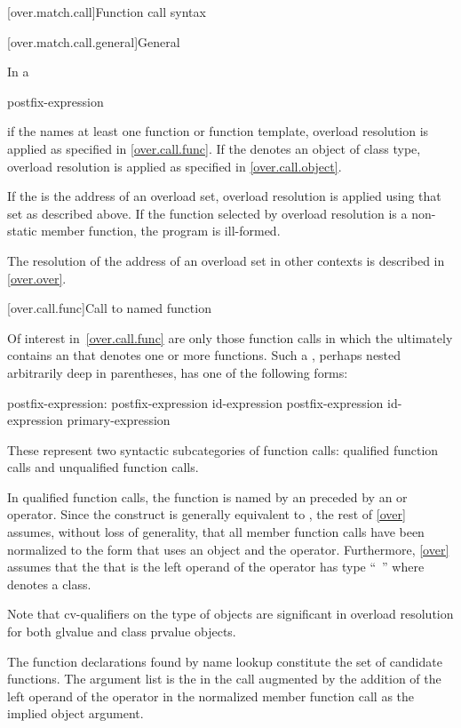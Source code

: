 [over.match.call]{Function call syntax}%

[over.match.call.general]{General}%

\pnum
In a 
\begin{ncsimplebnf}
postfix-expression \terminal{(}  \terminal{)}
\end{ncsimplebnf}
if the  names at least one function or
function template,
overload resolution is applied as specified in \ref{over.call.func}.
If the  denotes an object of class type, overload
resolution is applied as specified in \ref{over.call.object}.

\pnum
If the  is the address of an overload set,
overload resolution is applied using that set as described above.
If the function selected by overload resolution is a non-static member function,
the program is ill-formed.
\begin{note}
The resolution of the address of an
overload set in other contexts is described in \ref{over.over}.
\end{note}

[over.call.func]{Call to named function}

\pnum
Of interest in~\ref{over.call.func} are only those function calls in
which the 
ultimately contains an  that
denotes one or more functions.
Such a
,
perhaps nested arbitrarily deep in
parentheses, has one of the following forms:
\begin{ncbnf}
postfix-expression:\br
    postfix-expression  id-expression\br
    postfix-expression \terminal{->} id-expression\br
    primary-expression
\end{ncbnf}

These represent two syntactic subcategories of function calls:
qualified function calls and unqualified function calls.

\pnum
In qualified function calls,
the function is named by an 
preceded by an \tcode{->} or  operator.
Since the
construct
is generally equivalent to
,
the rest of
\ref{over} assumes, without loss of generality, that all member
function calls have been normalized to the form that uses an
object and the
operator.
Furthermore, \ref{over} assumes that
the
that is the left operand of the
operator
has type ``\cv{}~''
where
denotes a class.
\begin{footnote}
Note that cv-qualifiers on the type of objects are
significant in overload
resolution for
both glvalue and class prvalue objects.
\end{footnote}
The function declarations found by name lookup
constitute the set of candidate functions.
The argument list is the
in the call augmented by the addition of the left operand of
the
operator in the normalized member function call as the
implied object argument.

